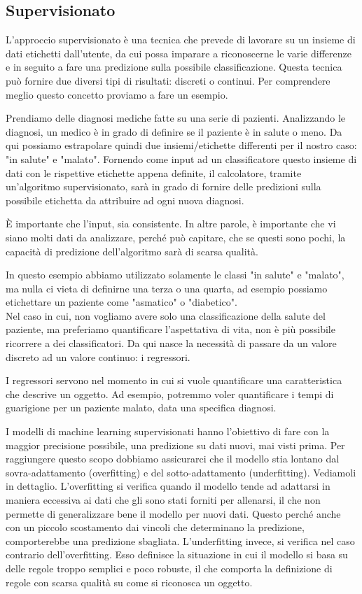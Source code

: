\documentclass[12pt,italian]{report}
\begin{document}
\subsection{Supervisionato}

L'approccio supervisionato è una tecnica che prevede di lavorare su un insieme di dati etichetti dall'utente, da cui possa imparare a riconoscerne le varie differenze e in seguito a fare una predizione sulla possibile classificazione. Questa tecnica può fornire due diversi tipi di risultati: discreti o continui. Per comprendere meglio questo concetto proviamo a fare un esempio.

Prendiamo delle diagnosi mediche fatte su una serie di pazienti. Analizzando le diagnosi, un medico è in grado di definire se il paziente è in salute o meno. Da qui possiamo estrapolare quindi due insiemi/etichette differenti per il nostro caso: "in salute" e "malato". Fornendo come input ad un classificatore questo insieme di dati con le rispettive etichette appena definite, il calcolatore, tramite un'algoritmo supervisionato, sarà in grado di fornire delle predizioni sulla possibile etichetta da attribuire ad ogni nuova diagnosi.

È importante che l'input, sia consistente. In altre parole, è importante che vi siano molti dati da analizzare, perché può capitare, che se questi sono pochi, la capacità di predizione dell'algoritmo sarà di scarsa qualità.

In questo esempio abbiamo utilizzato solamente le classi "in salute" e "malato", ma nulla ci vieta di definirne una terza o una quarta, ad esempio possiamo etichettare un paziente come "asmatico" o "diabetico".\\


Nel caso in cui, non vogliamo avere solo una classificazione della salute del paziente, ma preferiamo quantificare l'aspettativa di vita, non è più possibile ricorrere a dei classificatori. Da qui nasce la necessità di passare da un valore discreto ad un valore continuo: i regressori. 

I regressori servono nel momento in cui si vuole quantificare una caratteristica che descrive un oggetto. Ad esempio, potremmo voler quantificare i tempi di guarigione per un paziente malato, data una specifica diagnosi.

I modelli di machine learning supervisionati hanno l'obiettivo di fare con la maggior precisione possibile, una predizione su dati nuovi, mai visti prima. Per raggiungere questo scopo dobbiamo assicurarci che il modello stia lontano dal sovra-adattamento (overfitting) e del sotto-adattamento (underfitting). Vediamoli in dettaglio.
L'overfitting si verifica quando il modello tende ad adattarsi in maniera eccessiva ai dati che gli sono stati forniti per allenarsi, il che non permette di generalizzare bene il modello per nuovi dati. Questo perché anche con un piccolo scostamento dai vincoli che determinano la predizione, comporterebbe una predizione sbagliata.
L'underfitting invece, si verifica nel caso contrario dell'overfitting. Esso definisce la situazione in cui il modello si basa su delle regole troppo semplici e poco robuste, il che comporta la definizione di regole con scarsa qualità su come si riconosca un oggetto.
\end{document}
